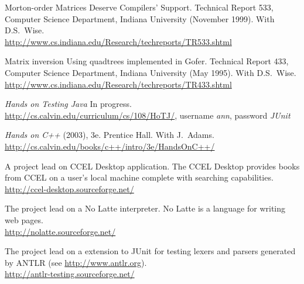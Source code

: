 \documentclass[ComputerScience]{vita}
\newcommand{\duphref}[1]{\href{#1}{#1}}
\begin{document}
\begin{vita}
\begin{Publications}
\begin{Papers at Refereed Conferences}
  \end{Papers at Refereed Conferences}

  \begin{Technical Reports}

  \item Morton-order Matrices Deserve Compilers' Support. Technical Report 533, Computer Science Department, Indiana University (November 1999).  With D.S.~Wise.  \\\duphref{http://www.cs.indiana.edu/Research/techreports/TR533.shtml}

  \item Matrix inversion Using quadtrees implemented in Gofer.  Technical Report 433, Computer Science Department, Indiana University (May 1995).  With D.S.~Wise.  \\\duphref{http://www.cs.indiana.edu/Research/techreports/TR433.shtml}

  \end{Technical Reports}

  \begin{Books}
  
  \item \textit{Hands on Testing Java} In progress.  \\\duphref{http://cs.calvin.edu/curriculum/cs/108/HoTJ/}, username \emph{ann}, password \emph{JUnit}

  \item \textit{Hands on C++} (2003), 3e.  Prentice Hall.  With J.\ Adams.  \\\duphref{http://cs.calvin.edu/books/c++/intro/3e/HandsOnC++/}

  \end{Books}

\end{Publications}

\begin{software}
	\item A project lead on CCEL Desktop application.  The CCEL Desktop provides books from CCEL on a user's local machine complete with searching capabilities.  \\\duphref{http://ccel-desktop.sourceforge.net/}
	\item The project lead on a No Latte interpreter.  No Latte is a language for writing web pages.  \\\duphref{http://nolatte.sourceforge.net/}
  \item The project lead on a extension to JUnit for testing lexers and parsers generated by ANTLR (see \duphref{http://www.antlr.org}).  \\\duphref{http://antlr-testing.sourceforge.net/}
\end{software}


\end{vita}
\end{document}

